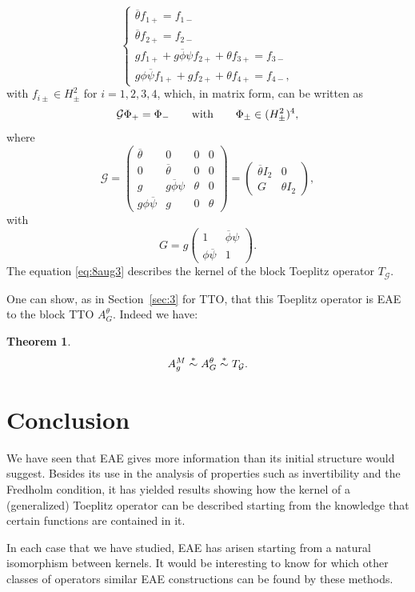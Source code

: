 \documentclass[11pt]{article}
\newtheorem{thm}{Theorem}[section]
\def\G{\mathcal G}
\def\beq{\begin{equation}}
\def\eeq{\end{equation}}
\def\ol{\overline}
\newcommand{\simast}{%
    \ensuremath{%
       \stackrel{\mathsf{\ast}}{\sim}}}
\begin{document}
 \begin{equation*}
  \begin{cases}
    \ol\theta f_{1+}= f_{1-} \\
    \ol\theta f_{2+}=f_{2-} \\
    gf_{1+}+g\ol\phi \psi   f_{2+} + \theta f_{3+} = f_{3-} \\
    g\phi\ol\psi f_{1+} + gf_{2+} + \theta f_{4+}= f_{4-},
  \end{cases}
\end{equation*}
with $f_{i\pm} \in H^2_\pm$ for $i=1,2,3,4$,
which, in matrix form, can be written as
\beq\label{eq:8aug3}
\G \Phi_+=\Phi_- \qquad \hbox{with} \qquad \Phi_\pm \in (H^2_\pm)^4,
\eeq
where 
\[
\G = \begin{pmatrix}
\ol\theta & 0 & 0 & 0 \\
0 & \ol\theta & 0 & 0 \\
g & g \ol\phi \psi & \theta & 0 \\
g\phi \ol\psi & g & 0 & \theta
\end{pmatrix}= \begin{pmatrix} \ol\theta I_2 & 0 \\ G & \theta I_2 \end{pmatrix}, 
\]
with 
\[
G= g \begin{pmatrix}1 & \ol\phi\psi \\ \phi\ol\psi & 1 \end{pmatrix}.
\]
The equation \eqref{eq:8aug3} describes the kernel of the block Toeplitz operator $T_\G$.

One can show, as in Section~\ref{sec:3} for TTO, that this Toeplitz operator is 
EAE to the block TTO $A^\theta_G$. Indeed we have:

\begin{thm}
\cite{COP22}
\[
A^M_g \simast A^\theta_G \simast T_\G.
\]
\end{thm}

\section{Conclusion}

We have seen that EAE gives more information than its initial structure would suggest.
Besides its use in the analysis of properties such as invertibility and the Fredholm condition, it has
yielded results showing how the kernel of a (generalized) Toeplitz operator 
can be described starting from the knowledge that certain functions are   contained in
it.


In each case that we have studied,
EAE has arisen starting from a natural isomorphism between kernels. It would be interesting to know for which other classes of operators similar EAE constructions can be found by these methods.
\end{document}
